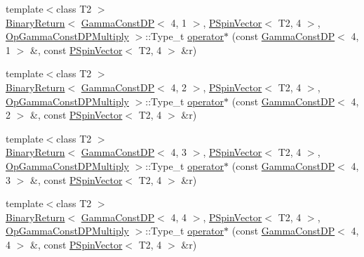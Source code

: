 \begin{DoxyCompactItemize}
\item 
{\footnotesize template$<$class T2 $>$ }\\\mbox{\hyperlink{structENSEM_1_1BinaryReturn}{Binary\+Return}}$<$ \mbox{\hyperlink{classENSEM_1_1GammaConstDP}{Gamma\+Const\+DP}}$<$ 4, 1 $>$, \mbox{\hyperlink{classENSEM_1_1PSpinVector}{P\+Spin\+Vector}}$<$ T2, 4 $>$, \mbox{\hyperlink{structENSEM_1_1OpGammaConstDPMultiply}{Op\+Gamma\+Const\+D\+P\+Multiply}} $>$\+::Type\+\_\+t \mbox{\hyperlink{group__primspinvector_gaed649bcddaa4c48fdd28113f712d2ab7}{operator$\ast$}} (const \mbox{\hyperlink{classENSEM_1_1GammaConstDP}{Gamma\+Const\+DP}}$<$ 4, 1 $>$ \&, const \mbox{\hyperlink{classENSEM_1_1PSpinVector}{P\+Spin\+Vector}}$<$ T2, 4 $>$ \&r)
\item 
{\footnotesize template$<$class T2 $>$ }\\\mbox{\hyperlink{structENSEM_1_1BinaryReturn}{Binary\+Return}}$<$ \mbox{\hyperlink{classENSEM_1_1GammaConstDP}{Gamma\+Const\+DP}}$<$ 4, 2 $>$, \mbox{\hyperlink{classENSEM_1_1PSpinVector}{P\+Spin\+Vector}}$<$ T2, 4 $>$, \mbox{\hyperlink{structENSEM_1_1OpGammaConstDPMultiply}{Op\+Gamma\+Const\+D\+P\+Multiply}} $>$\+::Type\+\_\+t \mbox{\hyperlink{group__primspinvector_gad71a48b8030b0f439b6c45ff4c5d550b}{operator$\ast$}} (const \mbox{\hyperlink{classENSEM_1_1GammaConstDP}{Gamma\+Const\+DP}}$<$ 4, 2 $>$ \&, const \mbox{\hyperlink{classENSEM_1_1PSpinVector}{P\+Spin\+Vector}}$<$ T2, 4 $>$ \&r)
\item 
{\footnotesize template$<$class T2 $>$ }\\\mbox{\hyperlink{structENSEM_1_1BinaryReturn}{Binary\+Return}}$<$ \mbox{\hyperlink{classENSEM_1_1GammaConstDP}{Gamma\+Const\+DP}}$<$ 4, 3 $>$, \mbox{\hyperlink{classENSEM_1_1PSpinVector}{P\+Spin\+Vector}}$<$ T2, 4 $>$, \mbox{\hyperlink{structENSEM_1_1OpGammaConstDPMultiply}{Op\+Gamma\+Const\+D\+P\+Multiply}} $>$\+::Type\+\_\+t \mbox{\hyperlink{group__primspinvector_ga62ad9e5b7456ea7e7aeb04de82e03545}{operator$\ast$}} (const \mbox{\hyperlink{classENSEM_1_1GammaConstDP}{Gamma\+Const\+DP}}$<$ 4, 3 $>$ \&, const \mbox{\hyperlink{classENSEM_1_1PSpinVector}{P\+Spin\+Vector}}$<$ T2, 4 $>$ \&r)
\item 
{\footnotesize template$<$class T2 $>$ }\\\mbox{\hyperlink{structENSEM_1_1BinaryReturn}{Binary\+Return}}$<$ \mbox{\hyperlink{classENSEM_1_1GammaConstDP}{Gamma\+Const\+DP}}$<$ 4, 4 $>$, \mbox{\hyperlink{classENSEM_1_1PSpinVector}{P\+Spin\+Vector}}$<$ T2, 4 $>$, \mbox{\hyperlink{structENSEM_1_1OpGammaConstDPMultiply}{Op\+Gamma\+Const\+D\+P\+Multiply}} $>$\+::Type\+\_\+t \mbox{\hyperlink{group__primspinvector_ga8651c7707116b78fc19958171acaabfd}{operator$\ast$}} (const \mbox{\hyperlink{classENSEM_1_1GammaConstDP}{Gamma\+Const\+DP}}$<$ 4, 4 $>$ \&, const \mbox{\hyperlink{classENSEM_1_1PSpinVector}{P\+Spin\+Vector}}$<$ T2, 4 $>$ \&r)

\end{DoxyCompactItemize}

